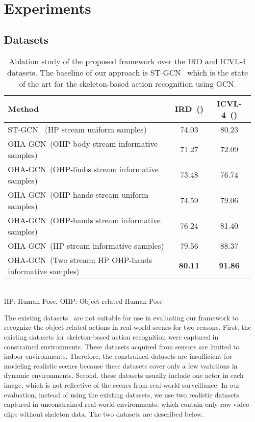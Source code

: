 \documentclass[10pt,twocolumn,letterpaper]{article}
\begin{document}
\section{Experiments}

\subsection{Datasets}

\begin{table*}[t]\centering
\caption{Ablation study of the proposed framework over the IRD and ICVL-4 datasets. The baseline of our approach is ST-GCN~\cite{stgcn2018aaai} which is the state of the art for the skeleton-based action recognition using GCN.} 
\vspace{3mm}
\centering
\begin{tabular}{p{10.5cm}|cc} 

\hline
Method & IRD~() & ICVL-4~()   \\\hline
ST-GCN~\cite{stgcn2018aaai} (HP stream  uniform samples) & 74.03 & 80.23   \\ \hline
OHA-GCN~(OHP-body stream  informative samples) & 71.27  & 72.09   \\ 
OHA-GCN~(OHP-limbs stream  informative samples) &  73.48 & 76.74  \\ 
OHA-GCN~(OHP-hands stream  uniform samples) & 74.59  & 79.06  \\ 
OHA-GCN~(OHP-hands stream  informative samples) &  76.24 & 81.40  \\ 
OHA-GCN~(HP stream  informative samples) & 79.56 & 88.37  \\
 \hline 
OHA-GCN~(Two stream; HP  OHP-hands  informative samples) & \textbf{80.11} & \textbf{91.86}   \\ 
\hline
\end{tabular}
\\{HP: Human Pose,  OHP: Object-related Human Pose}
\label{tabular:all_res}
\end{table*}


The existing datasets~\cite{hu2015jointly,shahroudy2016ntu,xia2012view} are not suitable for use in evaluating our framework to recognize the object-related actions in real-world scenes for two reasons.
First, the existing datasets for skeleton-based action recognition were captured in constrained environments.
These datasets acquired from sensors are limited to indoor environments.
Therefore, the constrained datasets are insufficient for modeling realistic scenes because these datasets cover only a few variations in dynamic environments.
Second, these datasets usually include one actor in each image, which is not reflective of the scenes from real-world surveillance.
In our evaluation, instead of using the existing datasets, we use two realistic datasets captured in unconstrained real-world environments, which contain only raw video clips without skeleton data. The two datasets are described below.
\end{document}
